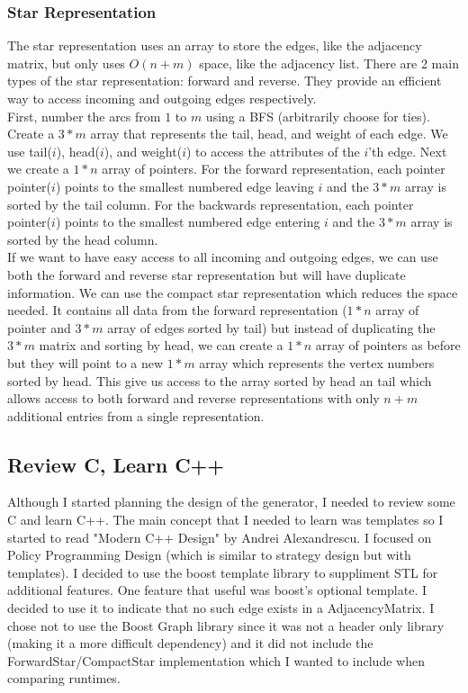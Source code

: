 \documentclass{article}
\begin{document}
\subsubsection{Star Representation}
The star representation \cite{Star} uses an array to store the edges, like the adjacency matrix, but only uses $O(n+m)$ space, like the adjacency list. There are 2 main types of the star representation: forward and reverse. They provide an efficient way to access incoming and outgoing edges respectively. \\
First, number the arcs from $1$ to $m$ using a BFS (arbitrarily choose for ties). Create a $3*m$ array that represents the tail, head, and weight of each edge. We use tail($i$), head($i$), and weight($i$) to access the attributes of the $i$'th edge. Next we create a $1*n$ array of pointers. For the forward representation, each pointer pointer($i$) points to the smallest numbered edge leaving $i$ and the $3*m$ array is sorted by the tail column. For the backwards representation, each pointer pointer($i$) points to the smallest numbered edge entering $i$ and the $3*m$ array is sorted by the head column. \\
If we want to have easy access to all incoming and outgoing edges, we can use both the forward and reverse star representation but will have duplicate information. We can use the compact star representation which reduces the space needed. It contains all data from the forward representation ($1*n$ array of pointer and $3*m$ array of edges sorted by tail) but instead of duplicating the $3*m$ matrix and sorting by head, we can create a $1*n$ array of pointers as before but they will point to a new $1*m$ array which represents the vertex numbers sorted by head. This give us access to the array sorted by head an tail which allows access to both forward and reverse representations with only $n+m$ additional entries from a single representation.

\subsection{Review C, Learn C++}
Although I started planning the design of the generator, I needed to review some C and learn C++. The main concept that I needed to learn was templates so I started to read "Modern C++ Design" by Andrei Alexandrescu. I focused on Policy Programming Design (which is similar to strategy design but with templates). I decided to use the boost template library to suppliment STL for additional features. One feature that useful was boost's optional template. I decided to use it to indicate that no such edge exists in a AdjacencyMatrix. I chose not to use the Boost Graph library since it was not a header only library (making it a more difficult dependency) and it did not include the ForwardStar/CompactStar implementation which I wanted to include when comparing runtimes.
\end{document}
